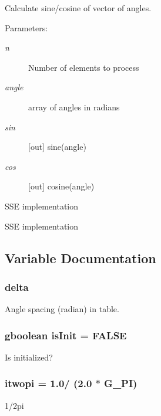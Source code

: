 Calculate sine/cosine of vector of angles. 

\begin{Desc}
\item[Parameters:]
\begin{description}
\item[{\em n}]Number of elements to process \item[{\em angle}]array of angles in radians \item[{\em sin}][out] sine(angle) \item[{\em cos}][out] cosine(angle)\end{description}
\end{Desc}


SSE implementation 

SSE implementation 

\subsection{Variable Documentation}
\subsubsection{ {\bf delta}}\label{ObitSinCos_8c_a4}


Angle spacing (radian) in table. 

\subsubsection{\setlength{\rightskip}{0pt plus 5cm}gboolean {\bf is\-Init} = FALSE}\label{ObitSinCos_8c_a2}


Is initialized? 

\subsubsection{ {\bf itwopi} = 1.0/ (2.0 $\ast$ G\_\-PI)}\label{ObitSinCos_8c_a5}


1/2pi 

